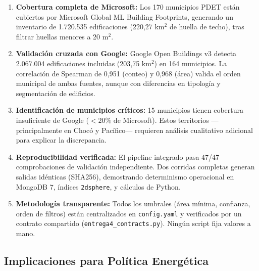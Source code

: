 \documentclass[11pt, a4paper]{article}
\begin{document}
\begin{enumerate}
    \item \textbf{Cobertura completa de Microsoft:} Los 170 municipios PDET están cubiertos por Microsoft Global ML Building Footprints, generando un inventario de 1.720.535 edificaciones (220,27 km$^2$ de huella de techo), tras filtrar huellas menores a 20 m$^2$.

    \item \textbf{Validación cruzada con Google:} Google Open Buildings v3 detecta 2.067.004 edificaciones incluidas (203,75 km$^2$) en 164 municipios. La correlación de Spearman de 0,951 (conteo) y 0,968 (área) valida el orden municipal de ambas fuentes, aunque con diferencias en tipología y segmentación de edificios.

    \item \textbf{Identificación de municipios críticos:} 15 municipios tienen cobertura insuficiente de Google ($< 20\%$ de Microsoft). Estos territorios —principalmente en Chocó y Pacífico— requieren análisis cualitativo adicional para explicar la discrepancia.

    \item \textbf{Reproducibilidad verificada:} El pipeline integrado pasa 47/47 comprobaciones de validación independiente. Dos corridas completas generan salidas idénticas (SHA256), demostrando determinismo operacional en MongoDB 7, índices \texttt{2dsphere}, y cálculos de Python.

    \item \textbf{Metodología transparente:} Todos los umbrales (área mínima, confianza, orden de filtros) están centralizados en \texttt{config.yaml} y verificados por un contrato compartido (\texttt{entrega4\_contracts.py}). Ningún script fija valores a mano.
\end{enumerate}

\subsection{Implicaciones para Política Energética}
\end{document}
